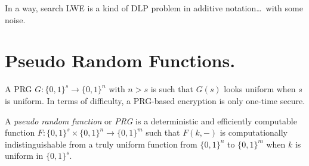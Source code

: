 \documentclass[./main]{subfiles}
\begin{document}
  In a way, search LWE is a kind of DLP problem in additive notation\ldots\ with some noise.

  \section{Pseudo Random Functions.}

  A PRG $G : \{0,1\}^s \to \{0,1\}^n$ with $n > s$ is such that  $G(s)$ looks uniform when $s$ is uniform.
  In terms of difficulty, a PRG-based encryption is only one-time secure.

  \begin{defn}
    A \textit{pseudo random function} or \textit{PRG} is a deterministic  and efficiently computable function $F : \{0,1\}^s \times \{0,1\}^n \to \{0,1\}^m$ such that $F(k, -)$ is computationally indistinguishable from a truly uniform function from $\{0,1\}^n$ to $\{0,1\}^m$ when $k$ is uniform in $\{0,1\}^s$.
  \end{defn}
\end{document}
